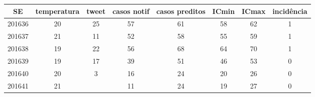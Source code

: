 \begin{tabular}{c|ccccccc}
  \hline
SE & temperatura & tweet & casos notif & casos preditos & ICmin & ICmax & incidência \\ 
  \hline
201636 & 20 & 25 & 57 & 61 & 58 & 62 & 1 \\ 
  201637 & 21 & 11 & 52 & 58 & 55 & 59 & 1 \\ 
  201638 & 19 & 22 & 56 & 68 & 64 & 70 & 1 \\ 
  201639 & 19 & 17 & 39 & 51 & 46 & 53 & 0 \\ 
  201640 & 20 & 3 & 16 & 24 & 20 & 26 & 0 \\ 
  201641 & 21 &  & 11 & 24 & 19 & 27 & 0 \\ 
   \hline
\end{tabular}
